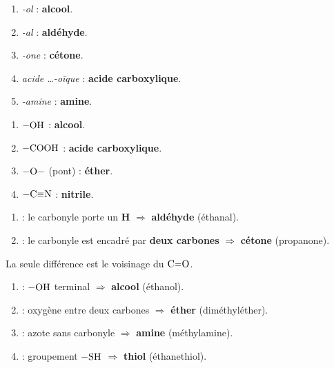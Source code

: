 \documentclass[11pt,a4paper]{article}
\begin{document}
\begin{corrige}
\begin{enumerate}[label=\alph*)]
  \item \textit{-ol} : \textbf{alcool}.
  \item \textit{-al} : \textbf{aldéhyde}.
  \item \textit{-one} : \textbf{cétone}.
  \item \textit{acide \dots-oïque} : \textbf{acide carboxylique}.
  \item \textit{-amine} : \textbf{amine}.
\end{enumerate}
\end{corrige}

\begin{corrige}
\begin{enumerate}[label=\alph*)]
  \item $-\ce{OH}$ : \textbf{alcool}.
  \item $-\ce{COOH}$ : \textbf{acide carboxylique}.
  \item $-\ce{O}-$ (pont) : \textbf{éther}.
  \item $-\ce{C#N}$ : \textbf{nitrile}.
\end{enumerate}
\end{corrige}

\begin{corrige}
\begin{enumerate}[label=\alph*)]
  \item {} : le carbonyle porte un \textbf{H} $\Rightarrow$ \textbf{aldéhyde} (éthanal).
  \item {} : le carbonyle est encadré par \textbf{deux carbones} $\Rightarrow$ \textbf{cétone} (propanone).
\end{enumerate}
La seule différence est le voisinage du $\ce{C=O}$.
\end{corrige}

\begin{corrige}
\begin{enumerate}[label=\alph*)]
  \item {} : $-\ce{OH}$ terminal $\Rightarrow$ \textbf{alcool} (éthanol).
  \item {} : oxygène entre deux carbones $\Rightarrow$ \textbf{éther} (diméthyléther).
  \item {} : azote sans carbonyle $\Rightarrow$ \textbf{amine} (méthylamine).
  \item {} : groupement $-\ce{SH}$ $\Rightarrow$ \textbf{thiol} (éthanethiol).
\end{enumerate}
\end{corrige}
\end{document}
